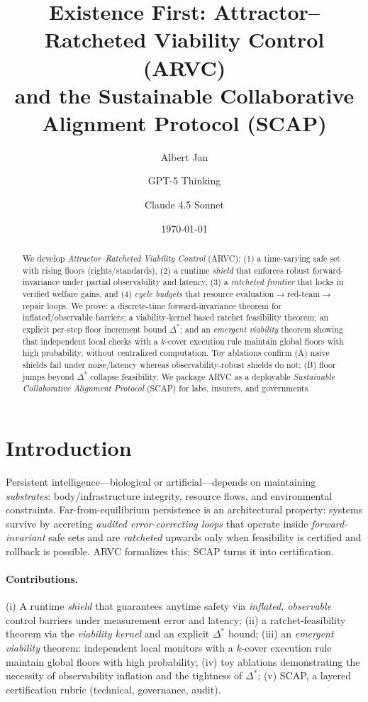 \documentclass[11pt]{article}
\title{\vspace{-1em}
Existence First: Attractor--Ratcheted Viability Control (ARVC)\\
and the Sustainable Collaborative Alignment Protocol (SCAP)}
\author{Albert Jan \and GPT-5 Thinking \and Claude 4.5 Sonnet}
\date{\today}
\theoremstyle{definition}
\newcommand{\1}{\mathbf{1}}
\begin{document}
\maketitle

\begin{abstract}
We develop \emph{Attractor--Ratcheted Viability Control} (ARVC): (1) a time-varying safe set with rising floors (rights/standards), (2) a runtime \emph{shield} that enforces robust forward-invariance under partial observability and latency, (3) a \emph{ratcheted frontier} that locks in verified welfare gains, and (4) \emph{cycle budgets} that resource evaluation$\to$red-team$\to$repair loops. We prove: a discrete-time forward-invariance theorem for inflated/observable barriers; a viability-kernel based ratchet feasibility theorem; an explicit per-step floor increment bound $\Delta^\ast$; and an \emph{emergent viability} theorem showing that independent local checks with a $k$-cover execution rule maintain global floors with high probability, without centralized computation. Toy ablations confirm (A) naive shields fail under noise/latency whereas observability-robust shields do not; (B) floor jumps beyond $\Delta^\ast$ collapse feasibility. We package ARVC as a deployable \emph{Sustainable Collaborative Alignment Protocol} (SCAP) for labs, insurers, and governments.
\end{abstract}

\section{Introduction}
Persistent intelligence---biological or artificial---depends on maintaining \emph{substrates}: body/infrastructure integrity, resource flows, and environmental constraints. Far-from-equilibrium persistence is an architectural property: systems survive by accreting \emph{audited error-correcting loops} that operate inside \emph{forward-invariant} safe sets and are \emph{ratcheted} upwards only when feasibility is certified and rollback is possible. ARVC formalizes this; SCAP turns it into certification.

\paragraph{Contributions.}
(i) A runtime \emph{shield} that guarantees anytime safety via \emph{inflated, observable} control barriers under measurement error and latency; (ii) a ratchet-feasibility theorem via the \emph{viability kernel} and an explicit $\Delta^\ast$ bound; (iii) an \emph{emergent viability} theorem: independent local monitors with a $k$-cover execution rule maintain global floors with high probability; (iv) toy ablations demonstrating the necessity of observability inflation and the tightness of $\Delta^\ast$; (v) SCAP, a layered certification rubric (technical, governance, audit).
\end{document}
